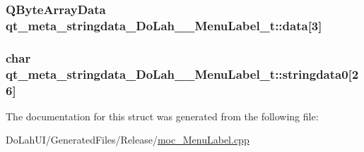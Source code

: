 \subsubsection[{data}]{\setlength{\rightskip}{0pt plus 5cm}Q\+Byte\+Array\+Data qt\+\_\+meta\+\_\+stringdata\+\_\+\+Do\+Lah\+\_\+\+\_\+\+Menu\+Label\+\_\+t\+::data\mbox{[}3\mbox{]}}\label{structqt__meta__stringdata___do_lah_____menu_label__t_a0f6e95f52f5aa30e5ef7a60b5911c0dd}
\hypertarget{structqt__meta__stringdata___do_lah_____menu_label__t_ae04ad799c51cb48c3194c52c81948fe9}{}
\subsubsection[{stringdata0}]{\setlength{\rightskip}{0pt plus 5cm}char qt\+\_\+meta\+\_\+stringdata\+\_\+\+Do\+Lah\+\_\+\+\_\+\+Menu\+Label\+\_\+t\+::stringdata0\mbox{[}26\mbox{]}}\label{structqt__meta__stringdata___do_lah_____menu_label__t_ae04ad799c51cb48c3194c52c81948fe9}


The documentation for this struct was generated from the following file\+:\begin{DoxyCompactItemize}
\item 
Do\+Lah\+U\+I/\+Generated\+Files/\+Release/\hyperlink{moc___menu_label_8cpp}{moc\+\_\+\+Menu\+Label.\+cpp}\end{DoxyCompactItemize}

